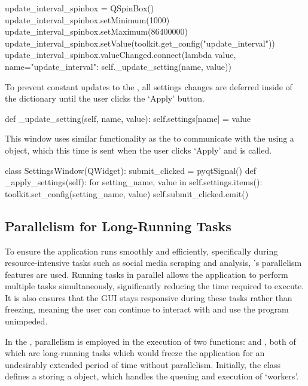     \begin{python}
update_interval_spinbox = QSpinBox()
update_interval_spinbox.setMinimum(1000)
update_interval_spinbox.setMaximum(86400000)
update_interval_spinbox.setValue(toolkit.get_config("update_interval"))
update_interval_spinbox.valueChanged.connect(lambda value, name="update_interval": self._update_setting(name, value))
    \end{python}

    To prevent constant updates to the , all settings changes are deferred inside of the  dictionary until the user clicks the `Apply' button.

    \begin{python}
def _update_setting(self, name, value):
    self.settings[name] = value
    \end{python}

    This window uses similar functionality as the  to communicate with the  using a  object, which this time is sent when the user clicks `Apply' and  is called.

    \begin{python}
class SettingsWindow(QWidget):
    submit_clicked = pyqtSignal()
    def _apply_settings(self):
        for setting_name, value in self.settings.items():
            toolkit.set_config(setting_name, value)
        self.submit_clicked.emit()
    \end{python}

    \subsection{Parallelism for Long-Running Tasks}
    To ensure the application runs smoothly and efficiently, specifically during resource-intensive tasks such as social media scraping and analysis, 's parallelism features are used. Running tasks in parallel allows the application to perform multiple tasks simultaneously, significantly reducing the time required to execute. It is also ensures that the GUI stays responsive during these tasks rather than freezing, meaning the user can continue to interact with and use the program unimpeded.

    In the , parallelism is employed in the execution of two functions:  and , both of which are long-running tasks which would freeze the application for an undesirably extended period of time without parallelism. Initially, the class defines a  storing a  object, which handles the queuing and execution of `workers'.

